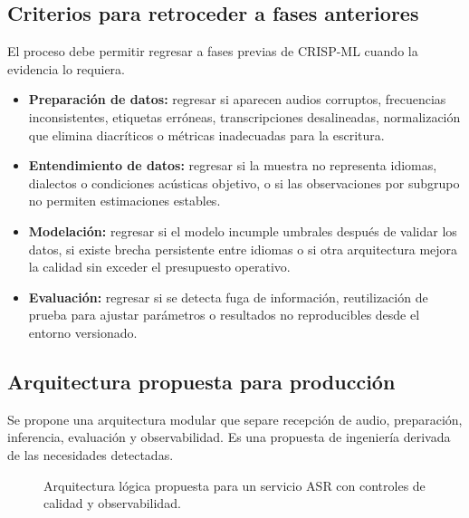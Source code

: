 \documentclass[11pt,letterpaper]{article}
\begin{document}
\subsection{Criterios para retroceder a fases anteriores}
El proceso debe permitir regresar a fases previas de CRISP-ML cuando la evidencia lo requiera.
\begin{itemize}
\item \textbf{Preparación de datos:} regresar si aparecen audios corruptos, frecuencias inconsistentes, etiquetas erróneas, transcripciones desalineadas, normalización que elimina diacríticos o métricas inadecuadas para la escritura.
\item \textbf{Entendimiento de datos:} regresar si la muestra no representa idiomas, dialectos o condiciones acústicas objetivo, o si las observaciones por subgrupo no permiten estimaciones estables.
\item \textbf{Modelación:} regresar si el modelo incumple umbrales después de validar los datos, si existe brecha persistente entre idiomas o si otra arquitectura mejora la calidad sin exceder el presupuesto operativo.
\item \textbf{Evaluación:} regresar si se detecta fuga de información, reutilización de prueba para ajustar parámetros o resultados no reproducibles desde el entorno versionado.
\end{itemize}

\subsection{Arquitectura propuesta para producción}
Se propone una arquitectura modular que separe recepción de audio, preparación, inferencia, evaluación y observabilidad. Es una propuesta de ingeniería derivada de las necesidades detectadas.
\begin{figure}[H]\centering
{}
\caption{Arquitectura lógica propuesta para un servicio ASR con controles de calidad y observabilidad.}\end{figure}
\end{document}
